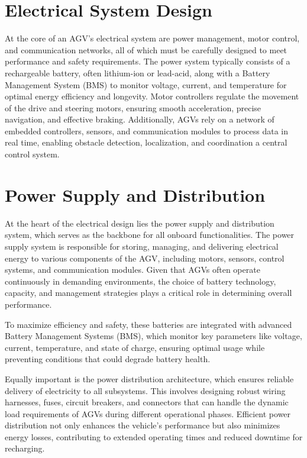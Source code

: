 \documentclass[../../main]{subfiles}
\begin{document}
\section{Electrical System Design}

At the core of an AGV’s electrical system are power management, motor control, 
and communication networks, all of which must be carefully designed to meet 
performance and safety requirements. The power system typically consists of 
a rechargeable battery, often lithium-ion or lead-acid, along with a Battery 
Management System (BMS) to monitor voltage, current, and temperature for 
optimal energy efficiency and longevity. Motor controllers regulate the 
movement of the drive and steering motors, ensuring smooth acceleration, 
precise navigation, and effective braking. Additionally, AGVs rely on a 
network of embedded controllers, sensors, and communication modules to 
process data in real time, enabling obstacle detection, localization, and 
coordination a central control system.

\section{Power Supply and Distribution}

At the heart of the electrical design lies the power supply and distribution system, 
which serves as the backbone for all onboard functionalities. 
The power supply system is responsible for storing, managing, 
and delivering electrical energy to various components of the AGV, 
including motors, sensors, control systems, and communication modules. 
Given that AGVs often operate continuously in demanding environments, 
the choice of battery technology, capacity, and management strategies 
plays a critical role in determining overall performance. 

To maximize efficiency and safety, these batteries are integrated 
with advanced Battery Management Systems (BMS), 
which monitor key parameters like voltage, current, temperature, 
and state of charge, ensuring optimal usage while preventing conditions 
that could degrade battery health. 

Equally important is the power distribution architecture, 
which ensures reliable delivery of electricity to all subsystems. 
This involves designing robust wiring harnesses, fuses, circuit breakers, 
and connectors that can handle the dynamic load requirements 
of AGVs during different operational phases. 
Efficient power distribution not only enhances the vehicle's performance 
but also minimizes energy losses, contributing to extended operating times 
and reduced downtime for recharging. 
\end{document}

